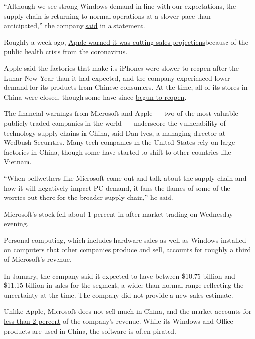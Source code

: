 ``Although we see strong Windows demand in line with our expectations,
the supply chain is returning to normal operations at a slower pace than
anticipated,'' the company
\href{https://news.microsoft.com/2020/02/26/microsoft-update-on-q3-fy20-guidance/}{said}
in a statement.

Roughly a week ago,
\href{https://www.nytimes3xbfgragh.onion/2020/02/17/technology/apple-coronavirus-economy.html}{Apple
warned it was cutting sales projections}because of the public health
crisis from the coronavirus.

Apple said the factories that make its iPhones were slower to reopen
after the Lunar New Year than it had expected, and the company
experienced lower demand for its products from Chinese consumers. At the
time, all of its stores in China were closed, though some have since
\href{https://www.bloomberg.com/news/articles/2020-02-24/apple-reopens-more-than-half-of-its-retail-stores-in-china}{begun
to reopen}.

The financial warnings from Microsoft and Apple --- two of the most
valuable publicly traded companies in the world --- underscore the
vulnerability of technology supply chains in China, said Dan Ives, a
managing director at Wedbush Securities. Many tech companies in the
United States rely on large factories in China, though some have started
to shift to other countries like Vietnam.

``When bellwethers like Microsoft come out and talk about the supply
chain and how it will negatively impact PC demand, it fans the flames of
some of the worries out there for the broader supply chain,'' he said.

Microsoft's stock fell about 1 percent in after-market trading on
Wednesday evening.

Personal computing, which includes hardware sales as well as Windows
installed on computers that other companies produce and sell, accounts
for roughly a third of Microsoft's revenue.

In January, the company said it expected to have between \$10.75 billion
and \$11.15 billion in sales for the segment, a wider-than-normal range
reflecting the uncertainty at the time. The company did not provide a
new sales estimate.

Unlike Apple, Microsoft does not sell much in China, and the market
accounts for
\href{https://www.geekwire.com/2020/microsoft-president-brad-smith-tech-cold-war-u-s-china-relations/}{less
than 2 percent} of the company's revenue. While its Windows and Office
products are used in China, the software is often pirated.

